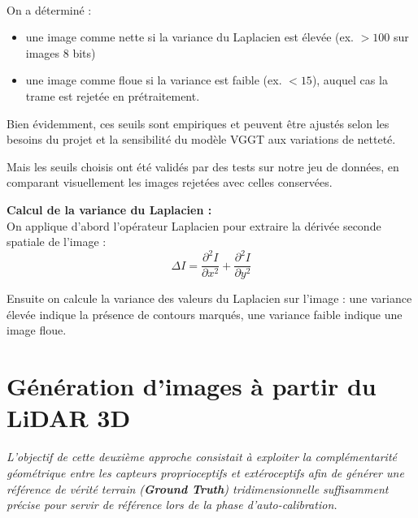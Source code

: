 \documentclass[12pt,a4paper,oneside]{report}
\begin{document}
\paragraph{}
On a déterminé : \vspace{0.05cm}
\begin{itemize}[itemsep=1em]
    \item une image comme nette si la variance du Laplacien est élevée (ex. $>100$ sur images 8 bits)
    \item une image comme floue si la variance est faible (ex. $<15$), auquel cas la trame est rejetée en prétraitement.
\end{itemize}

\vspace{0.5cm}

\hspace*{1cm} Bien évidemment, ces seuils sont empiriques et peuvent être ajustés selon les besoins du projet et la sensibilité du modèle VGGT aux variations de netteté. \vspace{0.05cm}

\hspace*{0.5cm}Mais les seuils choisis ont été validés par des tests sur notre jeu de données, en comparant visuellement les images rejetées avec celles conservées.\vspace{1cm}

\textbf{Calcul de la variance du Laplacien :}\\
On applique d'abord l'opérateur Laplacien pour extraire la dérivée seconde spatiale de l'image :
\[
\Delta I = \frac{\partial^2 I}{\partial x^2} + \frac{\partial^2 I}{\partial y^2}
\]

\vspace{1cm}

\hspace{0.5cm}Ensuite on calcule la variance des valeurs du Laplacien sur l'image : une variance élevée indique la présence de contours marqués, une variance faible indique une image floue.


\newpage

\section{Génération d'images à partir du LiDAR 3D}

\hspace*{1cm} \textit{L'objectif de cette deuxième approche consistait à exploiter la complémentarité géométrique entre les capteurs proprioceptifs et extéroceptifs afin de générer une référence de vérité terrain (\textbf{Ground Truth}) tridimensionnelle suffisamment précise pour servir de référence lors de la phase d'auto-calibration.}\vspace{0.1cm}
\end{document}
